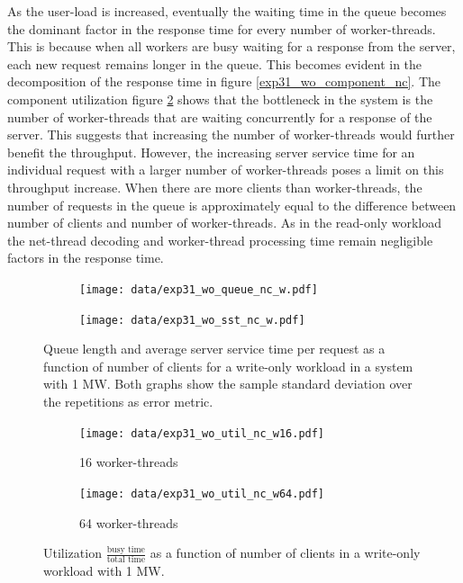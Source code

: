 \documentclass[report.tex]{subfiles}
\begin{document}
As the user-load is increased, eventually the waiting time in the queue becomes the dominant factor in the response time for every number of worker-threads. This is because when all workers are busy waiting for a response from the server,  each new request remains longer in the queue.
This becomes evident in the decomposition of the response time in figure \ref{exp31_wo_component_nc}.
The component utilization figure \ref{exp31_wo_util} shows that the bottleneck in the system is the number of worker-threads that are waiting concurrently for a response of the server. This suggests that increasing the number of worker-threads would further benefit the throughput. However, the increasing server service time for an individual request with a larger number of worker-threads poses a limit on this throughput increase.
When there are more clients than worker-threads, the number of requests in the queue is approximately equal to the difference between number of clients and number of worker-threads.
As in the read-only workload the net-thread decoding and worker-thread processing time remain negligible factors in the response time.


\begin{figure}[H]
	\begin{subfigure}[b]{.499\linewidth}
		\centering
		\texttt{[image: data/exp31\_wo\_queue\_nc\_w.pdf]}
	\end{subfigure}\hfill
	\begin{subfigure}[b]{.499\linewidth}
		\centering
		\texttt{[image: data/exp31\_wo\_sst\_nc\_w.pdf]}
	\end{subfigure}\hfill
	\caption{Queue length and average server service time per request as a function of number of clients for a write-only workload in a system with 1 MW. Both graphs show the sample standard deviation over the repetitions as error metric.}\label{exp31_wo_queue_sst_nc}
\end{figure}

\begin{figure}[H]
	\begin{subfigure}[b]{.499\linewidth}
		\centering
		\texttt{[image: data/exp31\_wo\_util\_nc\_w16.pdf]}
		\caption{16 worker-threads}
	\end{subfigure}\hfill
	\begin{subfigure}[b]{.499\linewidth}
		\centering
		\texttt{[image: data/exp31\_wo\_util\_nc\_w64.pdf]}
		\caption{64 worker-threads}
	\end{subfigure}\hfill
	\caption{Utilization $\frac{\text{busy time}}{\text{total time}}$ as a function of number of clients in a write-only workload with 1 MW.}\label{exp31_wo_util}
\end{figure}
\end{document}
